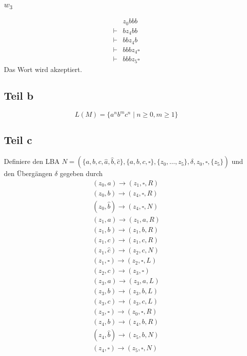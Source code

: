 \documentclass[10pt,a4paper]{article}
\begin{document}
\subsubsection{$w_{3}$}

\begin{align*}
  & z_{0}bbb\\
  \vdash & bz_{4}bb\\
  \vdash & bbz_{4}b\\
  \vdash & bbbz_{4}\square\\
  \vdash & bbbz_{5}\square
\end{align*}
Das Wort wird akzeptiert.

\subsection{Teil b}

\begin{equation}
  L(M) = \{ a^{n}b^{m}c^{n} \mid n \ge 0, m \ge 1 \}
\end{equation}

\subsection{Teil c}

Definiere den LBA $N = (\{ a, b, c, \hat{a}, \hat{b}, \hat{c} \}, \{ a, b, c, \square \}, \{ z_{0}, \dots, z_{5} \}, \delta, z_{0}, \square, \{ z_{5} \})$ und den Übergängen $\delta$ gegeben durch
\begin{align*}
  (z_{0}, a) \rightarrow (z_{1}, \square, R)\\
  (z_{0}, b) \rightarrow (z_{4}, \square, R)\\
  (z_{0}, \hat{b}) \rightarrow (z_{4}, \square, N)\\
  (z_{1}, a) \rightarrow (z_{1}, a, R)\\
  (z_{1}, b) \rightarrow (z_{1}, b, R)\\
  (z_{1}, c) \rightarrow (z_{1}, c, R)\\
  (z_{1}, \hat{c}) \rightarrow (z_{2}, c, N)\\
  (z_{1}, \square) \rightarrow (z_{2}, \square, L)\\
  (z_{2}, c) \rightarrow (z_{3}, \square)\\
  (z_{3}, a) \rightarrow (z_{3}, a, L)\\
  (z_{3}, b) \rightarrow (z_{3}, b, L)\\
  (z_{3}, c) \rightarrow (z_{3}, c, L)\\
  (z_{3}, \square) \rightarrow (z_{0}, \square, R)\\
  (z_{4}, b) \rightarrow (z_{4}, b, R)\\
  (z_{4}, \hat{b}) \rightarrow (z_{5}, b, N)\\
  (z_{4}, \square) \rightarrow (z_{5}, \square, N)
\end{align*}
\end{document}
